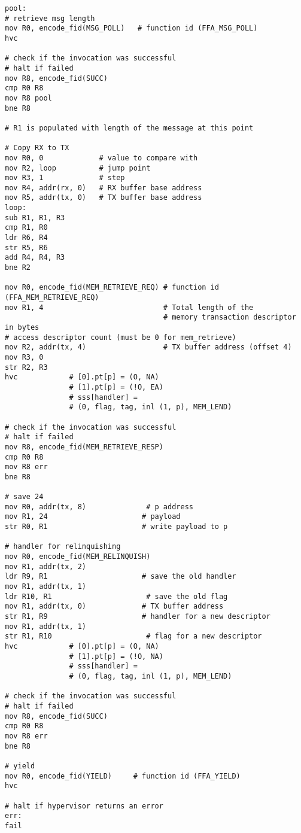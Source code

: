 \documentclass{article}
\begin{document}
\begin{lstlisting}[caption={VM 1}]
pool:
# retrieve msg length
mov R0, encode_fid(MSG_POLL)   # function id (FFA_MSG_POLL)
hvc

# check if the invocation was successful
# halt if failed
mov R8, encode_fid(SUCC)
cmp R0 R8
mov R8 pool
bne R8

# R1 is populated with length of the message at this point

# Copy RX to TX
mov R0, 0             # value to compare with
mov R2, loop          # jump point
mov R3, 1             # step
mov R4, addr(rx, 0)   # RX buffer base address
mov R5, addr(tx, 0)   # TX buffer base address
loop:
sub R1, R1, R3
cmp R1, R0
ldr R6, R4
str R5, R6
add R4, R4, R3
bne R2

mov R0, encode_fid(MEM_RETRIEVE_REQ) # function id (FFA_MEM_RETRIEVE_REQ)
mov R1, 4                            # Total length of the
                                     # memory transaction descriptor in bytes
# access descriptor count (must be 0 for mem_retrieve)
mov R2, addr(tx, 4)                  # TX buffer address (offset 4)
mov R3, 0
str R2, R3
hvc            # [0].pt[p] = (O, NA)
               # [1].pt[p] = (!O, EA)
               # sss[handler] =
               # (0, flag, tag, inl (1, p), MEM_LEND)

# check if the invocation was successful
# halt if failed
mov R8, encode_fid(MEM_RETRIEVE_RESP)
cmp R0 R8
mov R8 err
bne R8

# save 24
mov R0, addr(tx, 8)              # p address
mov R1, 24                      # payload
str R0, R1                      # write payload to p

# handler for relinquishing
mov R0, encode_fid(MEM_RELINQUISH)
mov R1, addr(tx, 2)
ldr R9, R1                      # save the old handler
mov R1, addr(tx, 1)
ldr R10, R1                      # save the old flag
mov R1, addr(tx, 0)             # TX buffer address
str R1, R9                      # handler for a new descriptor
mov R1, addr(tx, 1)
str R1, R10                      # flag for a new descriptor
hvc            # [0].pt[p] = (O, NA)
               # [1].pt[p] = (!O, NA)
               # sss[handler] =
               # (0, flag, tag, inl (1, p), MEM_LEND)

# check if the invocation was successful
# halt if failed
mov R8, encode_fid(SUCC)
cmp R0 R8
mov R8 err
bne R8

# yield
mov R0, encode_fid(YIELD)     # function id (FFA_YIELD)
hvc

# halt if hypervisor returns an error
err:
fail
\end{lstlisting}
\end{document}
